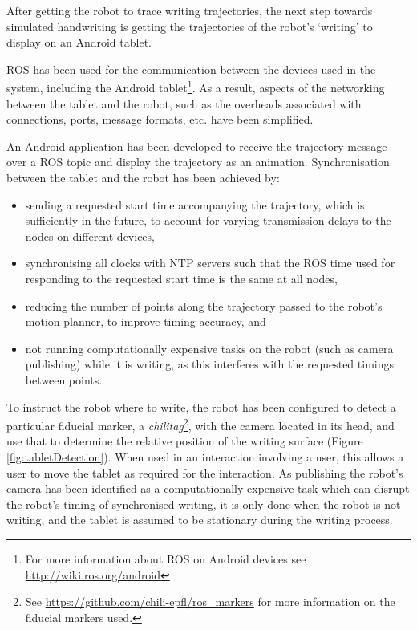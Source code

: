 \documentclass{sig-alternate}
\begin{document}
After getting the robot to trace writing trajectories, the next step towards
simulated handwriting is getting the trajectories of the robot's `writing' to
display on an Android tablet. 

ROS has been used for the communication between the devices used in the system,
including the Android tablet\footnote{For more information about ROS on Android
devices see \url{http://wiki.ros.org/android}}. As a result, aspects of the
networking between the tablet and the robot, such as the overheads associated
with connections, ports, message formats, etc. have been simplified. 

An Android application has been developed to receive the trajectory message over
a ROS topic and display the trajectory as an
animation. Synchronisation between the tablet and the robot has been achieved by:

\begin{itemize}

    \item sending a requested start time accompanying the trajectory, which is
        sufficiently in the future, to account for varying transmission delays
        to the nodes on different devices,

    \item synchronising all clocks with NTP servers such that the ROS time used
        for responding to the requested start time is the same at all nodes,

    \item reducing the number of points along the trajectory passed to the
        robot's motion planner, to improve timing accuracy, and

    \item not running computationally expensive tasks on the robot (such as
        camera publishing) while it is writing, as this interferes with the
        requested timings between points. 

\end{itemize}

To instruct the robot where to write, the robot has been configured to detect a
particular fiducial marker, a \emph{chilitag}\footnote{See
\url{https://github.com/chili-epfl/ros_markers} for more information on the
fiducial markers used.}, with the camera located in its head, and use that to
determine the relative position of the writing surface (Figure
\ref{fig:tabletDetection}). When used in an interaction involving a user, this
allows a user to move the tablet as required for the interaction. As publishing
the robot's camera has been identified as a computationally expensive task which
can disrupt the robot's timing of synchronised writing, it is only done when the
robot is not writing, and the tablet is assumed to be stationary during the
writing process.
\end{document}
